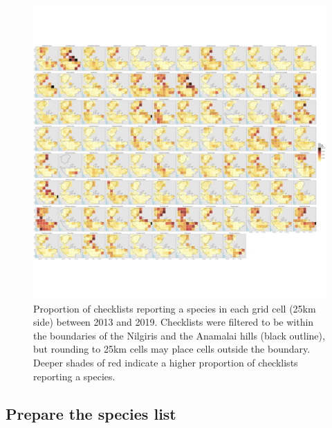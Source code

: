 \documentclass[]{article}
\newenvironment{Shaded}{}{}
\newcommand{\CommentTok}[1]{\textcolor[rgb]{0.00,0.50,0.00}{#1}}
\newcommand{\DataTypeTok}[1]{#1}
\newcommand{\KeywordTok}[1]{\textcolor[rgb]{0.00,0.00,1.00}{#1}}
\newcommand{\NormalTok}[1]{#1}
\newcommand{\StringTok}[1]{\textcolor[rgb]{0.00,0.50,0.50}{#1}}
\begin{document}
\begin{figure}
\centering
\includegraphics{figs/fig_species_distributions.png}
\caption{Proportion of checklists reporting a species in each grid cell (25km side) between 2013 and 2019. Checklists were filtered to be within the boundaries of the Nilgiris and the Anamalai hills (black outline), but rounding to 25km cells may place cells outside the boundary. Deeper shades of red indicate a higher proportion of checklists reporting a species.}
\end{figure}

\hypertarget{prepare-the-species-list}{%
\subsection{Prepare the species list}\label{prepare-the-species-list}}

\begin{Shaded}
\end{Shaded}
\end{document}
